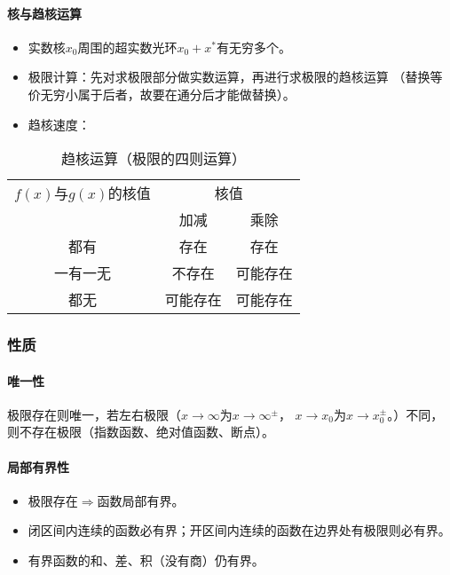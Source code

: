 \documentclass[
12pt, %
a4paper, 
oneside, %
headinclude,footinclude, %
]{scrartcl}
\begin{document}
\paragraph{核与趋核运算}
\begin{itemize}
\item 实数核$ x_0 $周围的超实数光环$ x_0 + x^* $有无穷多个。
\item 极限计算：先对求极限部分做实数运算，再进行求极限的趋核运算
（替换等价无穷小属于后者，故要在通分后才能做替换）。
\item 趋核速度：
\end{itemize}
\begin{table}[hbt]
\caption{趋核运算（极限的四则运算）}
\centering
\begin{tabular}{c|cc}
\toprule
$ f(x) $与$ g(x) $的核值 & \multicolumn{2}{c}{核值} \\
\cmidrule(lr){2-3}
& 加减 & 乘除 \\
\midrule
都有 & 存在 & 存在 \\
一有一无 & 不存在 & 可能存在 \\
都无 & 可能存在 & 可能存在 \\
\bottomrule
\end{tabular}
\end{table}
\subsubsection[性质]{性质}
\paragraph{唯一性}
极限存在则唯一，若左右极限（$ x \to \infty $为$ x \to \infty^\pm $，
$ x \to x_0 $为$ x \to x_0^\pm $。）不同，则不存在极限（指数函数、绝对值函数、断点）。
\paragraph{局部有界性}
\begin{itemize}
\item 极限存在$ \Rightarrow $函数局部有界。
\item 闭区间内连续的函数必有界；开区间内连续的函数在边界处有极限则必有界。
\item 有界函数的和、差、积（没有商）仍有界。
\end{itemize}
\end{document}
